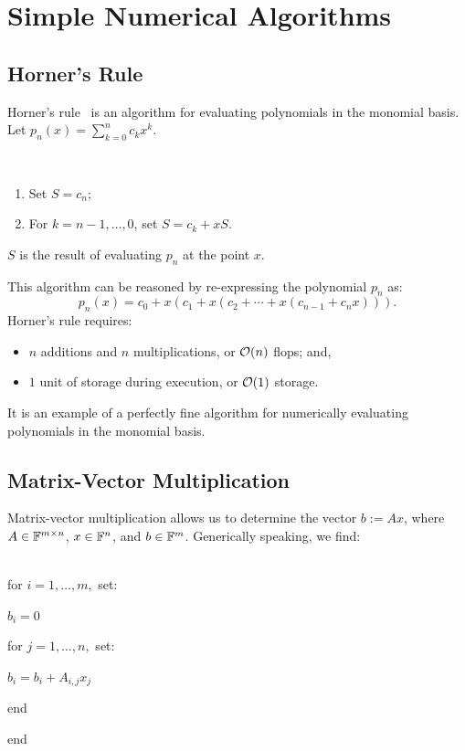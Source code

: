 \section{Simple Numerical Algorithms}

\subsection{Horner's Rule}

Horner's rule~\cite{Horner-109-308-19} is an algorithm for evaluating polynomials in the monomial basis. Let $p_n(x) = \sum_{k=0}^n c_kx^k$.
\begin{algorithm}~
\begin{enumerate}
\item Set $S = c_n$;
\item For $k = n-1,\ldots,0$, set $S = c_k + xS$.
\end{enumerate}
$S$ is the result of evaluating $p_n$ at the point $x$.
\end{algorithm}
This algorithm can be reasoned by re-expressing the polynomial $p_n$ as:
\[
p_n(x) = c_0 + x(c_1 + x(c_2 + \cdots + x(c_{n-1}+c_nx))).
\]
Horner's rule requires:
\begin{itemize}
\item $n$ additions and $n$ multiplications, or $\mathcal{O}(n)$ flops; and,
\item $1$ unit of storage during execution, or $\mathcal{O}(1)$ storage.
\end{itemize}
It is an example of a perfectly fine algorithm for numerically evaluating polynomials in the monomial basis.

\subsection{Matrix-Vector Multiplication}

Matrix-vector multiplication allows us to determine the vector $b := Ax$, where $A\in\mathbb{F}^{m\times n}$, $x\in\mathbb{F}^n$, and $b\in\mathbb{F}^m$. Generically speaking, we find:
\begin{algorithm}~\\
for $i=1,\ldots,m,$ set:

\hspace*{0.75cm} $b_i=0$

\hspace*{0.75cm} for $j=1,\ldots,n,$ set:

\hspace*{1.5cm} $b_i = b_i + A_{i,j}x_j$

\hspace*{0.75cm} end

end
\end{algorithm}

